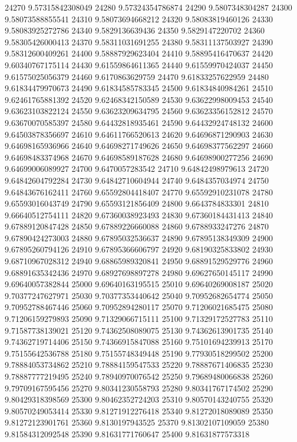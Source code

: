 {24270 9.57315842308049
24280 9.57324354786874
24290 9.5807348304287
24300 9.58073588855541
24310 9.58073694668212
24320 9.58083819460126
24330 9.58083925272786
24340 9.5829136639436
24350 9.5829147220702
24360 9.58305426000413
24370 9.58311031691255
24380 9.58311137503927
24390 9.58312600409261
24400 9.58887929623404
24410 9.58895416470637
24420 9.60340767175114
24430 9.61559864611365
24440 9.61559970424037
24450 9.61575025056379
24460 9.6170863629759
24470 9.61833257622959
24480 9.61834479970673
24490 9.61834585783345
24500 9.61834840984261
24510 9.62461765881392
24520 9.62468342150589
24530 9.63622998009453
24540 9.63623103822124
24550 9.63623209634795
24560 9.63623356152812
24570 9.63670070585397
24580 9.64432818935461
24590 9.64432924748132
24600 9.64503878356697
24610 9.64611766520613
24620 9.64696871290903
24630 9.64698165936966
24640 9.64698271749626
24650 9.64698377562297
24660 9.64698483374968
24670 9.64698589187628
24680 9.64698900277256
24690 9.64699006089927
24700 9.6470057283542
24710 9.64842498979613
24720 9.64842604792284
24730 9.64842710604944
24740 9.6484357034974
24750 9.64843676162411
24760 9.65592804418407
24770 9.65592910231078
24780 9.65593016043749
24790 9.65593121856409
24800 9.6643784833301
24810 9.66640512754111
24820 9.67360038923493
24830 9.67360184431413
24840 9.67889120847428
24850 9.67889226660088
24860 9.6788933247276
24870 9.67890424273003
24880 9.67895032536637
24890 9.67895138349309
24900 9.67895260794126
24910 9.67895366606797
24920 9.68190325833802
24930 9.68710967028312
24940 9.68865989320841
24950 9.68891529529776
24960 9.68891635342436
24970 9.68927698897278
24980 9.69627650145117
24990 9.69640057382844
25000 9.69640163195515
25010 9.69640269008187
25020 9.70377247627971
25030 9.70377353440642
25040 9.70952682654774
25050 9.70952788467446
25060 9.70952894280117
25070 9.71206021685475
25080 9.71206159279893
25090 9.71329066715111
25100 9.71329172527783
25110 9.71587738139021
25120 9.74362508089075
25130 9.74362613901735
25140 9.74362719714406
25150 9.74366915847088
25160 9.75101694239913
25170 9.75155642536788
25180 9.75155748349448
25190 9.77930518299502
25200 9.78884053734862
25210 9.78884159547533
25220 9.78887671406835
25230 9.78887777219495
25240 9.78940970076542
25250 9.79689480066838
25260 9.79709167595456
25270 9.80341230558793
25280 9.80341767174502
25290 9.80429318398569
25300 9.80462352724203
25310 9.80570143240755
25320 9.80570249053414
25330 9.81271912276418
25340 9.81272018089089
25350 9.81272123901761
25360 9.8130197943525
25370 9.81302107109059
25380 9.81584312092548
25390 9.81631771760647
25400 9.81631877573318
}
